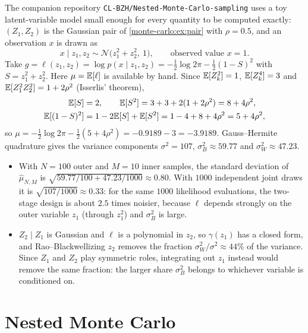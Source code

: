 \begin{notechapter}
\begin{example}\label{monte-carlo:ex:running}
The companion repository \texttt{CL-BZH/Nested-Monte-Carlo-sampling} uses a toy
latent-variable model small enough for every quantity to be computed exactly:
$(Z_1,Z_2)$ is the Gaussian pair of \cref{monte-carlo:ex:pair} with $\rho = 0.5$, and
an observation $x$ is drawn as
\[
  x\mid z_1,z_2\sim\mathcal N\bigl(z_1^2 + z_2^2,\ 1\bigr),
  \qquad\text{observed value } x = 1 .
\]
Take $g = \ell(z_1,z_2) = \log p(x\mid z_1,z_2) = -\tfrac12\log2\pi - \tfrac12(1 - S)^2$ with
$S = z_1^2 + z_2^2$. Here $\mu = \mathbb{E}[\ell]$ is available by hand. Since $\mathbb{E}[Z_k^2] = 1$,
$\mathbb{E}[Z_k^4] = 3$ and $\mathbb{E}[Z_1^2Z_2^2] = 1 + 2\rho^2$ (Isserlis' theorem),
\begin{align*}
  \mathbb{E}[S] &= 2,\qquad \mathbb{E}[S^2] = 3 + 3 + 2(1 + 2\rho^2) = 8 + 4\rho^2,\\
  \mathbb{E}[(1-S)^2] &= 1 - 2\mathbb{E}[S] + \mathbb{E}[S^2] = 1 - 4 + 8 + 4\rho^2 = 5 + 4\rho^2,
\end{align*}
so $\mu = -\tfrac12\log2\pi - \tfrac12(5 + 4\rho^2) = -0.9189 - 3 = -3.9189$. Gauss--Hermite
quadrature gives the variance components $\sigma^2 = 107$, $\sigma_B^2\approx59.77$ and
$\sigma_W^2\approx47.23$.
\begin{itemize}[nosep]
  \item With $N = 100$ outer and $M = 10$ inner samples, the standard deviation of
        $\hat\mu_{N,M}$ is $\sqrt{59.77/100 + 47.23/1000}\approx0.80$. With $1000$ independent
        joint draws it is $\sqrt{107/1000}\approx0.33$: for the same $1000$ likelihood
        evaluations, the two-stage design is about $2.5$ times noisier, because $\ell$
        depends strongly on the outer variable $z_1$ (through $z_1^2$) and $\sigma_B^2$ is large.
  \item $Z_2\mid Z_1$ is Gaussian and $\ell$ is a polynomial in $z_2$, so $\gamma(z_1)$ has a
        closed form, and Rao--Blackwellizing $z_2$ removes the fraction
        $\sigma_W^2/\sigma^2\approx44\%$ of the variance. Since $Z_1$ and $Z_2$ play symmetric
        roles, integrating out $z_1$ instead would remove the same fraction: the larger share
        $\sigma_B^2$ belongs to whichever variable is conditioned on.
\end{itemize}
\end{example}

\section{Nested Monte Carlo}\label{monte-carlo:sec:nested}


\end{notechapter}
